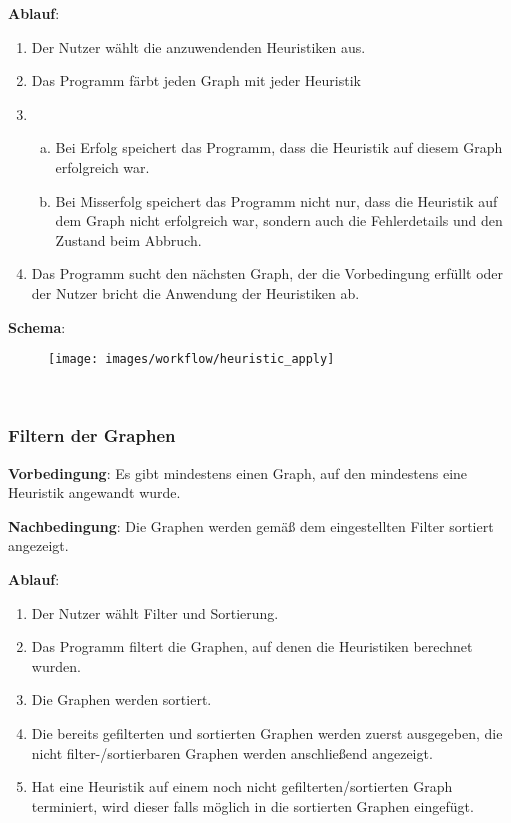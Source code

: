 \documentclass{article}
\begin{document}
	\textbf{Ablauf}:
	\begin{enumerate}[1)]
		\item{Der Nutzer wählt die anzuwendenden Heuristiken aus.}
		\item{Das Programm färbt jeden Graph mit jeder Heuristik}
		\item{
			\begin{enumerate}[a)]
				\item{Bei Erfolg speichert das Programm, dass die Heuristik auf diesem Graph erfolgreich war.}
				\item{Bei Misserfolg speichert das Programm nicht nur, dass die Heuristik auf dem Graph nicht erfolgreich war, sondern auch die Fehlerdetails und den Zustand beim Abbruch.}
			\end{enumerate}
		}
		\item{Das Programm sucht den nächsten Graph, der die Vorbedingung erfüllt oder der Nutzer bricht die Anwendung der Heuristiken ab.}
	\end{enumerate}
	
	\textbf{Schema}:
	~\begin{figure}[!h]
		\centering
		\texttt{[image: images/workflow/heuristic\_apply]}
	\end{figure}
	
	
	~\newpage
	\subsubsection{Filtern der Graphen}
	\textbf{Vorbedingung}: Es gibt mindestens einen Graph, auf den mindestens eine Heuristik angewandt wurde.
	
	\textbf{Nachbedingung}: Die Graphen werden gemäß dem eingestellten Filter sortiert angezeigt.
	
	\textbf{Ablauf}:
	\begin{enumerate}[1)]
		\item{Der Nutzer wählt Filter und Sortierung.}
		\item{Das Programm filtert die Graphen, auf denen die Heuristiken berechnet wurden.}
		\item{Die Graphen werden sortiert.}
		\item{Die bereits gefilterten und sortierten Graphen werden zuerst ausgegeben, die nicht filter-/sortierbaren Graphen werden anschließend angezeigt.}
		\item{Hat eine Heuristik auf einem noch nicht gefilterten/sortierten Graph terminiert, wird dieser falls möglich in die sortierten Graphen eingefügt.}
	\end{enumerate}
	
\end{document}
